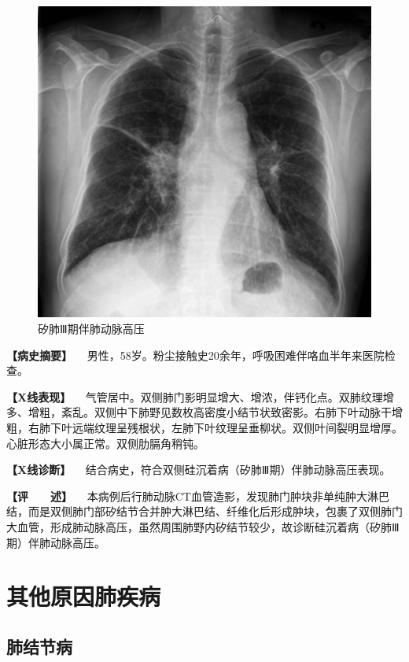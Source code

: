 \begin{figure}[!htbp]
 \centering
 \includegraphics{./images/Image00179.jpg}
 \captionsetup{justification=centering}
 \caption{矽肺Ⅲ期伴肺动脉高压}
 \label{fig3-9-2}
  \end{figure} 

\textbf{【病史摘要】}
　男性，58岁。粉尘接触史20余年，呼吸困难伴咯血半年来医院检查。

\textbf{【X线表现】}
　气管居中。双侧肺门影明显增大、增浓，伴钙化点。双肺纹理增多、增粗，紊乱。双侧中下肺野见数枚高密度小结节状致密影。右肺下叶动脉干增粗，右肺下叶远端纹理呈残根状，左肺下叶纹理呈垂柳状。双侧叶间裂明显增厚。心脏形态大小属正常。双侧肋膈角稍钝。

\textbf{【X线诊断】}
　结合病史，符合双侧硅沉着病（矽肺Ⅲ期）伴肺动脉高压表现。

\textbf{【评　　述】}
　本病例后行肺动脉CT血管造影，发现肺门肿块非单纯肿大淋巴结，而是双侧肺门部矽结节合并肿大淋巴结、纤维化后形成肿块，包裹了双侧肺门大血管，形成肺动脉高压，虽然周围肺野内矽结节较少，故诊断硅沉着病（矽肺Ⅲ期）伴肺动脉高压。

\section{其他原因肺疾病}

\subsection{肺结节病}

